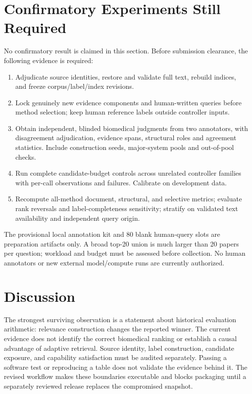 \documentclass{article}
\begin{document}
\section{Confirmatory Experiments Still Required}
No confirmatory result is claimed in this section. Before submission clearance,
the following evidence is required:
\begin{enumerate}
\item Adjudicate source identities, restore and validate full text, rebuild
indices, and freeze corpus/label/index revisions.
\item Lock genuinely new evidence components and human-written queries before
method selection; keep human reference labels outside controller inputs.
\item Obtain independent, blinded biomedical judgments from two annotators,
with disagreement adjudication, evidence spans, structural roles and agreement
statistics. Include construction seeds, major-system pools and out-of-pool checks.
\item Run complete candidate-budget controls across unrelated controller
families with per-call observations and failures. Calibrate on development data.
\item Recompute all-method document, structural, and selective metrics;
evaluate rank reversals and label-completeness sensitivity; stratify on validated
text availability and independent query origin.
\end{enumerate}
The provisional local annotation kit and 80 blank human-query slots are
preparation artifacts only. A broad top-20 union is much larger than 20 papers
per question; workload and budget must be assessed before collection. No human
annotators or new external model/compute runs are currently authorized.

\section{Discussion}
The strongest surviving observation is a statement about historical evaluation
arithmetic: relevance construction changes the reported winner. The current
evidence does not identify the correct biomedical ranking or establish a causal
advantage of adaptive retrieval. Source identity, label construction, candidate
exposure, and capability satisfaction must be audited separately. Passing a
software test or reproducing a table does not validate the evidence behind it.
The revised workflow makes these boundaries executable and blocks packaging
until a separately reviewed release replaces the compromised snapshot.
\label{page:mainend}
\end{document}

